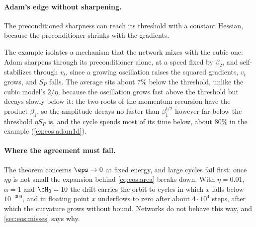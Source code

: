 \begin{refsection}
\paragraph{Adam's edge without sharpening.} The preconditioned sharpness can reach its threshold with a constant Hessian, because the preconditioner shrinks with the gradients.


The example isolates a mechanism that the network mixes with the cubic one: Adam sharpens through its preconditioner alone, at a speed fixed by $\beta_2$, and self-stabilizes through $v_t$, since a growing oscillation raises the squared gradients, $v_t$ grows, and $S_P$ falls. The average sits about $7\%$ below the threshold, unlike the cubic model's $2/\eta$, because the oscillation grows fast above the threshold but decays slowly below it: the two roots of the momentum recursion have the product $\beta_1$, so the amplitude decays no faster than $\beta_1^{t/2}$ however far below the threshold $\eta S_P$ is, and the cycle spends most of its time below, about $80\%$ in the example (\cref{ex:eos:adam1d}).

\paragraph{Where the agreement must fail.} The theorem concerns $\eps\to0$ at fixed energy, and large cycles fail first: once $\eta y$ is not small the expansion behind \eqref{eq:eos:area} breaks down. With $\eta=0.01$, $\alpha=1$ and $\cH_0=10$ the drift carries the orbit to cycles in which $x$ falls below $10^{-300}$, and in floating point $x$ underflows to zero after about $4\cdot10^4$ steps, after which the curvature grows without bound. Networks do not behave this way, and \cref{sec:eos:misses} says why.


\end{refsection}
